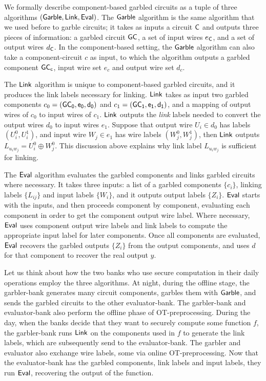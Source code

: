 

We formally describe component-based garbled circuits as a tuple of three algorithms $(\sf{Garble}, \sf{Link}, \sf{Eval})$.
The $\sf{Garble}$ algorithm is the same algorithm that we used before to garble circuits; it takes as inputs a circuit $\sf {C}$ and outputs three pieces of information: a garbled circuit $\sf {GC}$, a set of input wires $e_{\sf {C}}$, and a set of output wires $d_{\sf {C}}$.
In the component-based setting, the $\sf{Garble}$ algorithm can also take a component-circuit $c$ as input, to which the algorithm outputs a garbled component $\sf {GC}_c$, input wire set $e_c$ and output wire set $d_c$. 

The $\sf{Link}$ algorithm is unique to component-based garbled circuits, and it produces the link labels necessary for linking.
$\sf{Link}$ takes as input two garbled components $c_0 = (\sf {GC}_0, e_0, d_0)$ and $c_1 = (\sf {GC}_1, e_1, d_1)$, and a mapping of output wires of $c_0$ to input wires of $c_1$. 
$\sf{Link}$ outputs the \textit{link} labels needed to convert the output wires $d_0$ to input wires $e_1$. 
Suppose that output wire $U_i \in d_0$ has labels $(U_i^0, U_i^1)$, and input wire $W_j \in e_1$ has wire labels $(W_j^0, W_j^1)$, then $\sf{Link}$ outputs $L_{u_i w_j} = U_i^0 \oplus W_j^0$. 
This discussion above explains why link label $L_{u_i w_j}$ is sufficient for linking. 

The $\sf{Eval}$ algorithm evaluates the garbled components and links garbled circuits where necessary.
It takes three inputs: a list of a garbled components $\{c_i\}$, linking labels $\{L_{ij}\}$ and input labels $\{W_i\}$, and it outputs output labels $\{Z_i\}$. 
$\sf{Eval}$ starts with the inputs, and then proceeds component by component, evaluating each component in order to get the component output wire label.
Where necessary, $\sf{Eval}$ uses component output wire labels and link labels to compute the appropriate input label for later components. 
Once all components are evaluated, $\sf{Eval}$ recovers the garbled outputs $\{Z_i\}$ from the output components, and uses $d$ for that component to recover the real output $y$. 

Let us think about how the two banks who use secure computation in their daily operations employ the three algorithms.
At night, during the offline stage, the garbler-bank generates many circuit components, garbles them with $\sf{Garble}$, and sends the garbled circuits to the other evaluator-bank. 
The garbler-bank and evaluator-bank also perform the offline phase of OT-preprocessing.
During the day, when the banks decide that they want to securely compute some function $f$, the garbler-bank runs $\sf{Link}$ on the components used in $f$ to generate the link labels, which are subsequently send to the evaluator-bank.
The garbler and evaluator also exchange wire labels, some via online OT-preprocessing. 
Now that the evaluator-bank has the garbled components, link labels and input labels, they run $\sf{Eval}$, recovering the output of the function.

